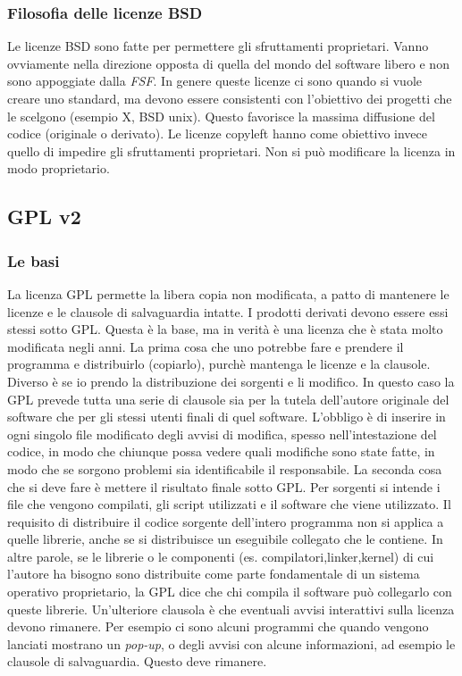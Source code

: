\subsubsection{Filosofia delle licenze BSD}

Le licenze BSD sono fatte per permettere gli sfruttamenti proprietari. Vanno ovviamente nella direzione opposta di quella del mondo del software libero e non sono appoggiate dalla \textit{FSF}. In genere queste licenze ci sono quando si vuole creare uno standard, ma devono essere consistenti con l'obiettivo dei progetti che le scelgono (esempio X, BSD unix). Questo favorisce la massima diffusione del codice (originale o derivato). Le licenze copyleft hanno come obiettivo invece quello di impedire gli sfruttamenti proprietari. Non si può modificare la licenza in modo proprietario. 

\subsection{GPL v2}

\subsubsection{Le basi}

La licenza GPL permette la libera copia non modificata, a patto di mantenere le licenze e le clausole di salvaguardia intatte. I prodotti derivati devono essere essi stessi sotto GPL. Questa è la base, ma in verità è una licenza che è stata molto modificata negli anni. La prima cosa che uno potrebbe fare e prendere il programma e distribuirlo (copiarlo), purchè mantenga le licenze e la clausole. Diverso è se io prendo la distribuzione dei sorgenti e li modifico. In questo caso la GPL prevede tutta una serie di clausole sia per la tutela dell'autore originale del software che per gli stessi utenti finali di quel software. L'obbligo è di inserire in ogni singolo file modificato degli avvisi di modifica, spesso nell'intestazione del codice, in modo che chiunque possa vedere quali modifiche sono state fatte, in modo che se sorgono problemi sia identificabile il responsabile. La seconda cosa che si deve fare è mettere il risultato finale sotto GPL. Per sorgenti si intende i file che vengono compilati, gli script utilizzati e il software che viene utilizzato. Il requisito di distribuire il codice sorgente dell'intero programma non si applica a quelle librerie, anche se si distribuisce un eseguibile collegato che le contiene. In altre parole, se le librerie o le componenti (es. compilatori,linker,kernel) di cui l'autore ha bisogno sono distribuite come parte fondamentale di un sistema operativo proprietario, la GPL dice che chi compila il software può collegarlo con queste librerie. Un'ulteriore clausola è che eventuali avvisi interattivi sulla licenza devono rimanere. Per esempio ci sono alcuni programmi che quando vengono lanciati mostrano un \textit{pop-up}, o degli avvisi con alcune informazioni, ad esempio le clausole di salvaguardia. Questo deve rimanere. 

